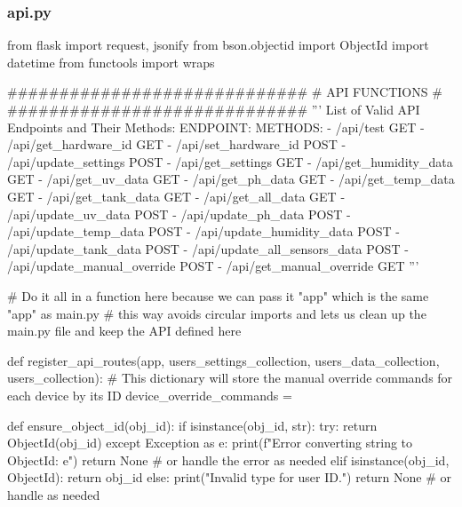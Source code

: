 \documentclass[12pt]{article} %
\begin{document}
\subsubsection{api.py}
\begin{pythoncode}[caption={Flask Backend API Code}]
    from flask import request, jsonify
    from bson.objectid import ObjectId
    import datetime
    from functools import wraps
    
    #############################
    #       API FUNCTIONS       #
    #############################
    '''
        List of Valid API Endpoints and Their Methods:
        ENDPOINT:                       METHODS:
        - /api/test                     GET
        - /api/get_hardware_id          GET
        - /api/set_hardware_id          POST
        - /api/update_settings          POST
        - /api/get_settings             GET
        - /api/get_humidity_data        GET
        - /api/get_uv_data              GET
        - /api/get_ph_data              GET
        - /api/get_temp_data            GET
        - /api/get_tank_data            GET
        - /api/get_all_data             GET
        - /api/update_uv_data           POST
        - /api/update_ph_data           POST
        - /api/update_temp_data         POST
        - /api/update_humidity_data     POST
        - /api/update_tank_data         POST
        - /api/update_all_sensors_data  POST
        - /api/update_manual_override   POST
        - /api/get_manual_override      GET
    '''
    
    # Do it all in a function here because we can pass it "app" which is the same "app" as main.py
    # this way avoids circular imports and lets us clean up the main.py file and keep the API defined here
    
    
    
    def register_api_routes(app, users_settings_collection, users_data_collection, users_collection):
        # This dictionary will store the manual override commands for each device by its ID
        device_override_commands = {}
    
    
        def ensure_object_id(obj_id):
            if isinstance(obj_id, str):
                try:
                    return ObjectId(obj_id)
                except Exception as e:
                    print(f"Error converting string to ObjectId: {e}")
                    return None  # or handle the error as needed
            elif isinstance(obj_id, ObjectId):
                return obj_id
            else:
                print("Invalid type for user ID.")
                return None  # or handle as needed
            

\end{pythoncode}
\end{document}
